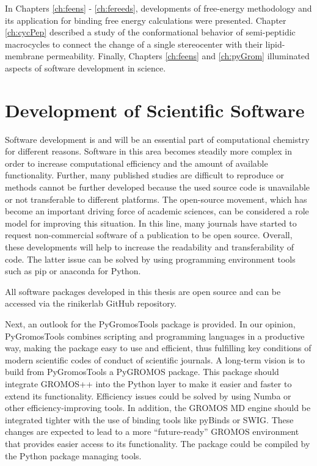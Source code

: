 
In Chapters \ref{ch:feens} - \ref{ch:fereeds}, developments of free-energy methodology and its application for binding free energy calculations were presented. Chapter \ref{ch:cycPep} described a study of the conformational behavior of semi-peptidic macrocycles  to connect the change of a single stereocenter with their lipid-membrane permeability. Finally, Chapters \ref{ch:feens} and \ref{ch:pyGrom} illuminated aspects of software development in science.

\section{Development of Scientific Software}
Software development is and will be an essential part of computational chemistry for different reasons.  Software in this area becomes steadily more complex in order to increase computational efficiency and the amount of available functionality. Further, many published studies are difficult to reproduce or methods cannot be further developed because the used source code is unavailable or not transferable to different platforms.\cite{Walters2013, Walters2020} The open-source movement, which has become an important driving force of academic sciences, can be considered a role model for improving this situation.\cite{Walters2020, Oliphant2007} In this line, many journals have started to request non-commercial software of a publication to be open source. \cite{Jcconduct2021, Scienceconduct2021, Natureconduct2021}  Overall, these developments will help to increase the readability and transferability of code.\cite{Walters2020} The latter issue can be solved by using programming environment tools such as pip or anaconda for Python. \cite{Anaconda2020, Pypi2021}

All software packages developed in this thesis are open source and can be accessed via the rinikerlab GitHub repository. %

Next, an outlook for the PyGromosTools package is provided. In our opinion, PyGromosTools combines scripting and programming languages in a productive way, making the package easy to use and efficient, thus fulfilling key conditions of modern scientific codes of conduct of scientific journals. 
A long-term vision is to build from PyGromosTools a PyGROMOS package. This package should integrate GROMOS++ \cite{Eichenberger2011} into the Python layer to make it easier and faster to extend its functionality. Efficiency issues could be solved by using Numba or other efficiency-improving tools. In addition, the GROMOS MD engine \cite{Schmid2012} should be integrated tighter with the use of binding tools like pyBinds or SWIG. \cite{Wenzel2011, Beazley1996} These changes are expected to lead to a more ``future-ready'' GROMOS environment that provides easier access to its functionality. The package could be compiled by the Python package managing tools. 


